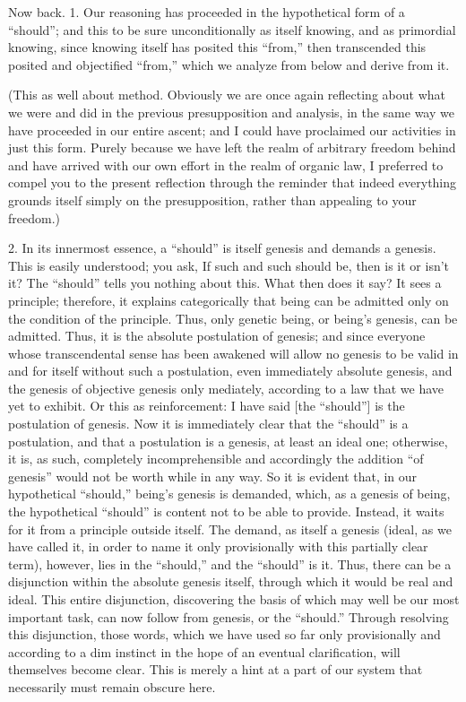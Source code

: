 Now back.
1. Our reasoning has proceeded in
the hypothetical form of a “should”;
and this to be sure unconditionally as itself knowing,
and as primordial knowing,
since knowing itself has posited this “from,”
then transcended this posited and objectified “from,”
which we analyze from below and derive from it.

(This as well about method.
Obviously we are once again reflecting about
what we were and did in the previous presupposition and analysis,
in the same way we have proceeded in our entire ascent;
and I could have proclaimed our activities in just this form.
Purely because we have left the realm of arbitrary freedom behind
and have arrived with our own effort in the realm of organic law,
I preferred to compel you to the present reflection
through the reminder that indeed everything
grounds itself simply on the presupposition,
rather than appealing to your freedom.)

2. In its innermost essence,
a “should” is itself genesis and demands a genesis.
This is easily understood;
you ask, If such and such should be,
then is it or isn't it?
The “should” tells you nothing about this.
What then does it say?
It sees a principle;
therefore, it explains categorically
that being can be admitted only on
the condition of the principle.
Thus, only genetic being,
or being's genesis, can be admitted.
Thus, it is the absolute postulation of genesis;
and since everyone whose
transcendental sense has been awakened
will allow no genesis to be
valid in and for itself
without such a postulation,
even immediately absolute genesis,
and the genesis of objective genesis only mediately,
according to a law that we have yet to exhibit.
Or this as reinforcement:
I have said [the “should”] is
the postulation of genesis.
Now it is immediately clear that
the “should” is a postulation,
and that a postulation is a genesis,
at least an ideal one;
otherwise, it is, as such,
completely incomprehensible and
accordingly the addition “of genesis”
would not be worth while in any way.
So it is evident that, in our hypothetical “should,”
being's genesis is demanded, which, as a genesis of being,
the hypothetical “should” is content not to be able to provide.
Instead, it waits for it from a principle outside itself.
The demand, as itself a genesis
(ideal, as we have called it, in order to name it
only provisionally with this partially clear term),
however, lies in the “should,”
and the “should” is it.
Thus, there can be a disjunction
within the absolute genesis itself,
through which it would be real and ideal.
This entire disjunction,
discovering the basis of which
may well be our most important task,
can now follow from genesis,
or the “should.”
Through resolving this disjunction,
those words, which we have used so far only provisionally and
according to a dim instinct in the hope of an eventual clarification,
will themselves become clear.
This is merely a hint at a part of our system
that necessarily must remain obscure here.

